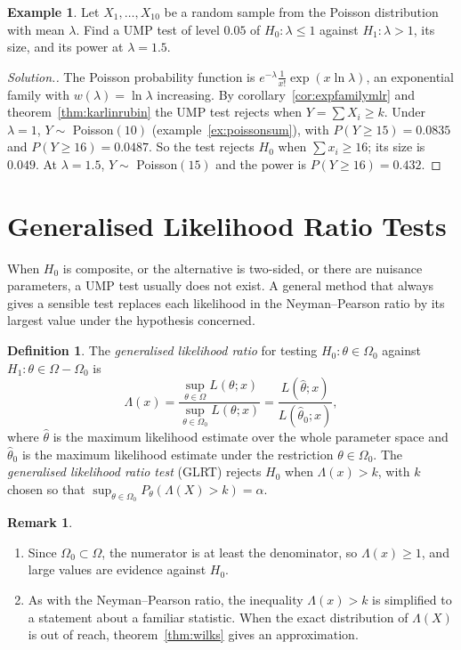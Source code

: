\documentclass[12pt,a4paper]{report}
\theoremstyle{definition}
\newtheorem{definition}[thm]{Definition}
\newtheorem{example}[thm]{Example}
\newtheorem{remark}[thm]{Remark}
\theoremstyle{plain}
\newenvironment{solution}
  {\renewcommand{\qedsymbol}{}\begin{proof}[\textit{Solution}.]}
  {\end{proof}}
\begin{document}
\begin{example}
\label{ex:umppoisson}
Let $X_1,\dots,X_{10}$ be a random sample from the Poisson distribution with mean
$\lambda$. Find a UMP test of level $0.05$ of $H_0\colon\lambda\le 1$ against
$H_1\colon\lambda>1$, its size, and its power at $\lambda = 1.5$.
\end{example}

\begin{solution}
The Poisson probability function is
$e^{-\lambda}\frac{1}{x!}\exp(x\ln\lambda)$, an exponential family with
$w(\lambda) = \ln\lambda$ increasing. By corollary~\ref{cor:expfamilymlr} and
theorem~\ref{thm:karlinrubin} the UMP test rejects when $Y = \sum X_i\ge k$. Under
$\lambda = 1$, $Y\sim$ Poisson$(10)$ (example~\ref{ex:poissonsum}), with
$P(Y\ge 15) = 0.0835$ and $P(Y\ge 16) = 0.0487$. So the test rejects $H_0$ when
$\sum x_i\ge 16$; its size is $0.049$. At $\lambda = 1.5$, $Y\sim$ Poisson$(15)$ and
the power is $P(Y\ge 16) = 0.432$.
\end{solution}

\section{Generalised Likelihood Ratio Tests}

When $H_0$ is composite, or the alternative is two-sided, or there are nuisance
parameters, a UMP test usually does not exist. A general method that always gives
a sensible test replaces each likelihood in the Neyman--Pearson ratio by its
largest value under the hypothesis concerned.

\begin{definition}
\label{def:glrt}
The \emph{generalised likelihood ratio} for testing $H_0\colon\theta\in\Omega_0$
against $H_1\colon\theta\in\Omega - \Omega_0$ is
\[\Lambda(x) = \frac{\sup_{\theta\in\Omega} L(\theta;x)}{\sup_{\theta\in\Omega_0} L(\theta;x)}
= \frac{L(\hat\theta;x)}{L(\hat\theta_0;x)} ,\]
where $\hat\theta$ is the maximum likelihood estimate over the whole parameter
space and $\hat\theta_0$ is the maximum likelihood estimate under the restriction
$\theta\in\Omega_0$. The \emph{generalised likelihood ratio test} (GLRT) rejects
$H_0$ when $\Lambda(x)>k$, with $k$ chosen so that
$\sup_{\theta\in\Omega_0} P_\theta(\Lambda(X)>k) = \alpha$.
\end{definition}

\begin{remark}
\label{rem:glrt}
\begin{enumerate}
\item Since $\Omega_0\subset\Omega$, the numerator is at least the denominator,
so $\Lambda(x)\ge 1$, and large values are evidence against $H_0$.
\item As with the Neyman--Pearson ratio, the inequality $\Lambda(x)>k$ is
simplified to a statement about a familiar statistic. When the exact distribution
of $\Lambda(X)$ is out of reach, theorem~\ref{thm:wilks} gives an approximation.
\end{enumerate}
\end{remark}
\end{document}
